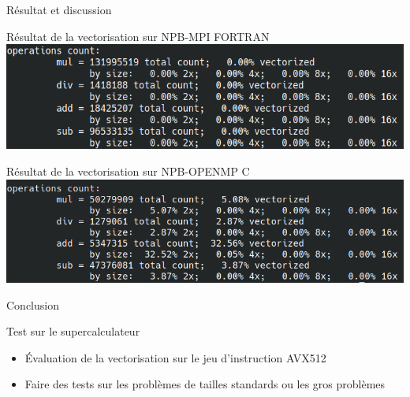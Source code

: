 \documentclass{beamer}
\begin{document}
\begin{frame}{Résultat et discussion}

  \begin{block}{Résultat de la vectorisation sur NPB-MPI FORTRAN}
    \includegraphics[width=0.6\linewidth]{../ressources/vect1.png}
  \end{block}
  
  \begin{block}{Résultat de la vectorisation sur NPB-OPENMP C}
    \includegraphics[width=0.6\linewidth]{../ressources/vcopenmp.png}
  \end{block}

\end{frame}

\begin{frame}{ Conclusion}

  \begin{block}{Test sur le supercalculateur}
    \begin{itemize}
    \item Évaluation de la vectorisation sur le jeu d'instruction AVX512
    \item Faire des tests sur les problèmes de tailles standards ou les gros problèmes
    \end{itemize}
  \end{block}
  
\end{frame}
\end{document}
